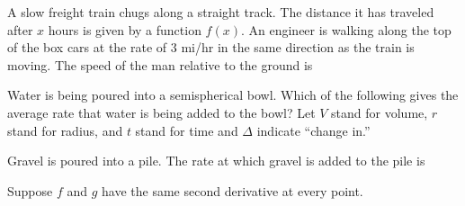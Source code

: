 \documentclass{ximera}
\newcommand{\recommendation}[1]{}
\newcommand{\GoodQuestions}[1]{}
\begin{document}
\begin{shuffle}
\begin{problem}
  A slow freight train chugs along a straight track.  The distance it
  has traveled after $x$ hours is given by a function $f(x)$.  An
  engineer is walking along the top of the box cars at the rate of $3$
  mi/hr in the same direction as the train is moving.  The speed of
  the man relative to the ground is
  \begin{multipleChoice}
  \end{multipleChoice}
\end{problem}




\begin{problem}
  Water is being poured into a semispherical bowl.  Which of the
  following gives the average rate that water is being added to the
  bowl?  Let $V$ stand for volume, $r$ stand for radius, and $t$ stand
  for time and $\Delta$ indicate ``change in.''
  \begin{multipleChoice}
  \end{multipleChoice}
\end{problem}


\begin{problem}
  Gravel is poured into a pile. The rate at which gravel is added to
  the pile is
\begin{multipleChoice}
\end{multipleChoice}
\end{problem}




\begin{problem}
  Suppose $f$ and $g$ have the same second derivative at every point.  
  \begin{multipleChoice}
  \end{multipleChoice}
\end{problem}


\end{shuffle}
\end{document}
